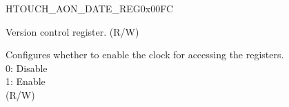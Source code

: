 \begin{register}{H}{TOUCH\_AON\_DATE\_REG}{0x00FC}\label{regdesc:TOUCHAONDATEREG}
%
%
\regnewline%
\begin{regdesc}\begin{reglist}
\label{fielddesc:TOUCHAONDATE}\item [TOUCH\_AON\_DATE] Version control register. (R/W)
\label{fielddesc:TOUCHAONCLKEN}\item [TOUCH\_AON\_CLK\_EN] Configures whether to enable the clock for accessing the registers. \\
0: Disable \\
1: Enable\\
(R/W)
\end{reglist}\end{regdesc}
\end{register}
